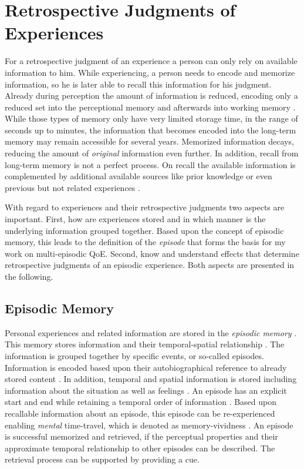 \section{Retrospective Judgments of Experiences}\label{chap:03}
For a retrospective judgment of an experience a person can only rely on available information to him.
While experiencing, a person needs to encode and memorize information, so he is later able to recall this information for his judgment.
Already during perception the amount of information is reduced, encoding only a reduced set into the perceptional memory and afterwards into working memory \citep[\cf,][p.~8f.]{raake_speech_2006}.
While those types of memory only have very limited storage time, in the range of seconds up to minutes, the information that becomes encoded into the long-term memory may remain accessible for several years.
Memorized information decays, reducing the amount of \emph{original} information even further.
In addition, recall from long-term memory is not a perfect process.
On recall the available information is complemented by additional available sources like prior knowledge or even previous but not related experiences \citep[\cf,][]{schacter_seven_2003}.

With regard to experiences and their retrospective judgments two aspects are important.
First, how are experiences stored and in which manner is the underlying information grouped together.
Based upon the concept of episodic memory, this leads to the definition of the \emph{episode} that forms the basis for my work on multi-episodic \ac{QoE}.
Second, know and understand effects that determine retrospective judgments of an episodic experience.
Both aspects are presented in the following.

\subsection{Episodic Memory}
Personal experiences and related information are stored in the \emph{episodic memory} \citep{tulving_episodic_1972}.
This memory stores information and their temporal-spatial relationship \citep[][p.~385]{tulving_episodic_1972}.
The information is grouped together by specific events, or so-called episodes.
Information is encoded based upon their autobiographical reference to already stored content \citep[][p.~385f.]{tulving_episodic_1972}.
In addition, temporal and spatial information is stored including information about the situation as well as feelings \citep[][p.~385f.]{tulving_episodic_1972}.
An episode has an explicit start and end while retaining a temporal order of information \citep[][p.~262]{conway_construction_2000}.
Based upon recallable information about an episode, this episode can be re-experienced enabling \emph{mental} time-travel, which is denoted as memory-vividness \citep{conway_construction_2000}.
An episode is successful memorized and retrieved, if the perceptual properties and their approximate temporal relationship to other episodes can be described.
The retrieval process can be supported by providing a cue.

